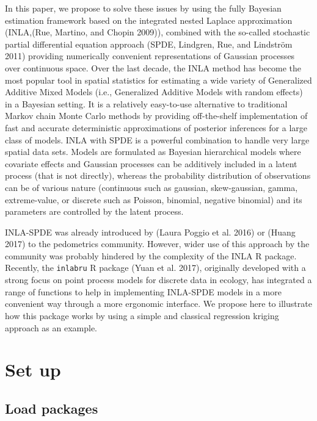\documentclass[
  a4paper,
]{article}
\begin{document}
In this paper, we propose to solve these issues by using the fully
Bayesian estimation framework based on the integrated nested Laplace
approximation (INLA,(Rue, Martino, and Chopin 2009)), combined with the
so-called stochastic partial differential equation approach (SPDE,
Lindgren, Rue, and Lindström 2011) providing numerically convenient
representations of Gaussian processes over continuous space. Over the
last decade, the INLA method has become the most popular tool in spatial
statistics for estimating a wide variety of Generalized Additive Mixed
Models (i.e., Generalized Additive Models with random effects) in a
Bayesian setting. It is a relatively easy-to-use alternative to
traditional Markov chain Monte Carlo methods by providing off-the-shelf
implementation of fast and accurate deterministic approximations of
posterior inferences for a large class of models. INLA with SPDE is a
powerful combination to handle very large spatial data sets. Models are
formulated as Bayesian hierarchical models where covariate effects and
Gaussian processes can be additively included in a latent process (that
is not directly), whereas the probability distribution of observations
can be of various nature (continuous such as gaussian, skew-gaussian,
gamma, extreme-value, or discrete such as Poisson, binomial, negative
binomial) and its parameters are controlled by the latent process.

INLA-SPDE was already introduced by (Laura Poggio et al. 2016) or (Huang
2017) to the pedometrics community. However, wider use of this approach
by the community was probably hindered by the complexity of the INLA R
package. Recently, the \texttt{inlabru} R package (Yuan et al. 2017),
originally developed with a strong focus on point process models for
discrete data in ecology, has integrated a range of functions to help in
implementing INLA-SPDE models in a more convenient way through a more
ergonomic interface. We propose here to illustrate how this package
works by using a simple and classical regression kriging approach as an
example.

\hypertarget{set-up}{%
\section{Set up}\label{set-up}}

\hypertarget{load-packages}{%
\subsection{Load packages}\label{load-packages}}
\end{document}
